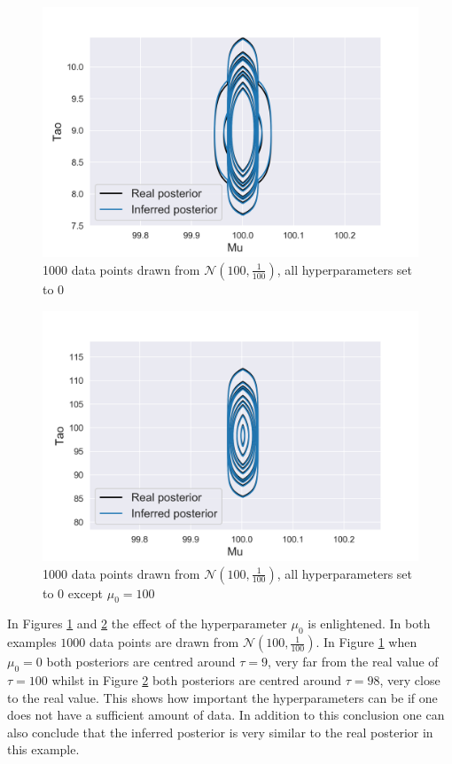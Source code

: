 \begin{figure}[H]
  \centering
  \includegraphics[width=\linewidth]{VI_plot_N_1000-mu_100-tau_100.png}
  \caption{1000 data points drawn from $\mathcal{N}(100,\frac{1}{100})$, all hyperparameters set to $0$}
  \label{VI_3}
\end{figure}

\begin{figure}[H]
  \centering
  \includegraphics[width=\linewidth]{VI_plot_N_1000-mu_100-tau_100-mu0_100.png}
  \caption{1000 data points drawn from $\mathcal{N}(100,\frac{1}{100})$, all hyperparameters set to $0$ except $\mu_0 = 100$ }
  \label{VI_4}
\end{figure}

In Figures \ref{VI_3} and \ref{VI_4} the effect of the hyperparameter $\mu_0$ is enlightened. In both examples $1000$ data points are drawn from $\mathcal{N}(100,\frac{1}{100})$. In Figure \ref{VI_3} when $\mu_0 = 0$ both posteriors are centred around $\tau = 9$, very far from the real value of $\tau = 100$ whilst in Figure \ref{VI_4} both posteriors are centred around $\tau = 98$, very close to the real value. This shows how important the hyperparameters can be if one does not have a sufficient amount of data. In addition to this conclusion one can also conclude that the inferred posterior is very similar to the real posterior in this example. 
